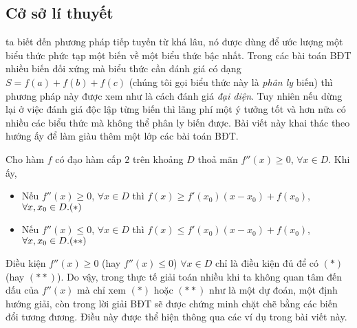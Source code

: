 {\subsection{Cở sở lí thuyết}
 ta biết đến phương pháp tiếp tuyến từ khá lâu, nó được dùng để ước lượng một biểu thức phức tạp một biến về một biểu thức bậc nhất. Trong các bài toán BĐT nhiều biến đối xứng mà biểu thức cần đánh giá có dạng $S=f(a)+f(b)+f(c)$ (chúng tôi gọi biểu thức này là \textit{phân ly} biến) thì phương pháp này được xem như là cách đánh giá \textit{đại diện}. Tuy nhiên nếu dừng lại ở việc đánh giá độc lập từng biến thì lãng phí một ý tưởng tốt và hơn nữa có nhiều các biểu thức mà không thể phân ly biến được. Bài viết này khai thác theo hướng ấy để làm giàu thêm một lớp các bài toán BĐT.
\begin{dl}
	Cho hàm $f$ có đạo hàm cấp $2$ trên khoảng $D$ thoả mãn $f''(x)\ge 0$, $\forall x \in D$. Khi ấy, 
	\begin{itemize}
		\item Nếu $f''(x) \ge 0$, $\forall x \in D$ thì $f(x) \ge f'(x_0)(x-x_0)+f(x_0)$, $\forall x, x_0 \in D. \hfill (*)$
		\item Nếu $f''(x) \le 0$, $\forall x \in D$ thì $f(x) \le f'(x_0)(x-x_0)+f(x_0)$, $\forall x, x_0 \in D. \hfill (**)$
	\end{itemize}
\end{dl}
\begin{nx}
	Điều kiện $f''(x) \ge 0$ (hay $f''(x)\le 0$) $\forall x \in D$ chỉ là điều kiện đủ để có $(*)$ (hay $(**)$). Do vậy, trong thực tế giải toán nhiều khi ta không quan tâm đến dấu của $f''(x)$ mà chỉ xem $(*)$ hoặc $(**)$ như là một dự đoán, một định hướng giải, còn trong lời giải BĐT sẽ được chứng minh chặt chẽ bằng các biến đổi tương đương. Điều này được thể hiện thông qua các ví dụ trong bài viết này.
\end{nx}
}
